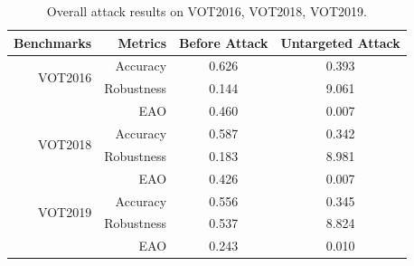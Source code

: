 \documentclass[journal]{IEEEtran}
\begin{document}
\begin{table}[t]
  \centering
  \caption{Overall attack results on VOT2016, VOT2018, VOT2019.}
  \begin{tabular}{rrcc}
  \toprule
  Benchmarks & Metrics & Before Attack    & Untargeted Attack  \\
  \midrule
  \multirow{2}{*}[-6pt]{VOT2016} 
  & Accuracy   & 0.626 & 0.393\\
  & Robustness & 0.144 & 9.061\\
  & EAO        & 0.460 & 0.007\\
  \midrule
  \multirow{2}{*}[-6pt]{VOT2018} 
  & Accuracy   & 0.587 & 0.342\\
  & Robustness & 0.183 & 8.981\\
  & EAO        & 0.426 & 0.007\\
  \midrule
  \multirow{2}{*}[-6pt]{VOT2019} 
  & Accuracy   & 0.556 & 0.345\\
  & Robustness & 0.537 & 8.824\\
  & EAO        & 0.243 & 0.010\\
  \bottomrule
  \end{tabular}
  \label{tab:benchmark results1}
\end{table}
\end{document}
